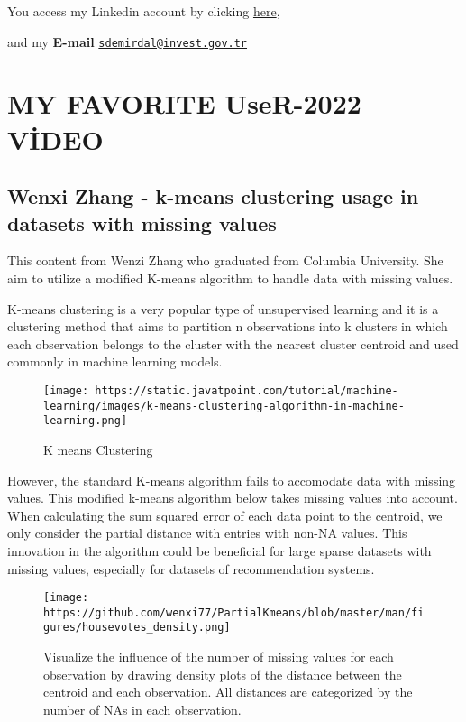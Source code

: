\documentclass[
  letterpaper,
  DIV=11,
  numbers=noendperiod]{scrreprt}
\begin{document}
You access my Linkedin account by clicking
\href{https://www.linkedin.com/in/sabri-demirdal-0508a1169/}{here},

and my \textbf{E-mail}
\href{mailto:sdemirdal@invest.gov.tr}{\nolinkurl{sdemirdal@invest.gov.tr}}


\hypertarget{my-favorite-user-2022-video}{%
\chapter{MY FAVORITE UseR-2022
VİDEO}\label{my-favorite-user-2022-video}}

\hypertarget{wenxi-zhang---k-means-clustering-usage-in-datasets-with-missing-values}{%
\section{Wenxi Zhang - k-means clustering usage in datasets with missing
values}\label{wenxi-zhang---k-means-clustering-usage-in-datasets-with-missing-values}}

This content from Wenzi Zhang who graduated from Columbia University.
She aim to utilize a modified K-means algorithm to handle data with
missing values.

K-means clustering is a very popular type of unsupervised learning and
it is a clustering method that aims to partition n observations into k
clusters in which each observation belongs to the cluster with the
nearest cluster centroid and used commonly in machine learning models.

\begin{figure}

{\centering \texttt{[image: https://static.javatpoint.com/tutorial/machine-learning/images/k-means-clustering-algorithm-in-machine-learning.png]}

}

\caption{K means Clustering}

\end{figure}

However, the standard K-means algorithm fails to accomodate data with
missing values. This modified k-means algorithm below takes missing
values into account. When calculating the sum squared error of each data
point to the centroid, we only consider the partial distance with
entries with non-NA values. This innovation in the algorithm could be
beneficial for large sparse datasets with missing values, especially for
datasets of recommendation systems.

\begin{figure}

{\centering \texttt{[image: https://github.com/wenxi77/PartialKmeans/blob/master/man/figures/housevotes\_density.png]}

}

\caption{Visualize the influence of the number of missing values for
each observation by drawing density plots of the distance between the
centroid and each observation. All distances are categorized by the
number of NAs in each observation.}

\end{figure}
\end{document}
